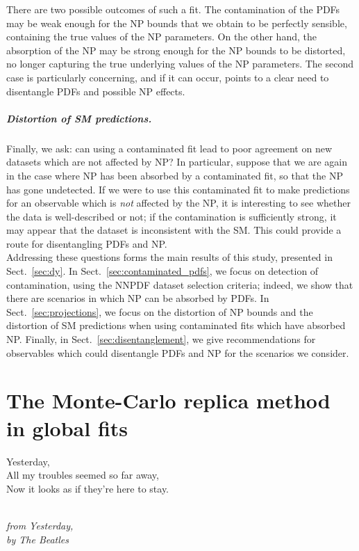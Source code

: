 \documentclass[withindex,glossary]{cam-thesis}
\begin{document}
There are two possible outcomes of such a fit. The contamination of the PDFs may be weak enough for the NP bounds that we obtain to be perfectly sensible, containing the true values of the NP parameters. On the other hand, the absorption of the NP may be strong enough for the NP bounds to be distorted, no longer capturing the true underlying values of the NP parameters. The second case is particularly concerning, and if it can occur, points to a clear need to disentangle PDFs and possible NP effects.

\paragraph{Distortion of SM predictions.} Finally, we ask: can using a contaminated fit lead to poor agreement on new datasets which are not affected by NP? In particular, suppose that we are again in the case where NP has been absorbed by a contaminated fit, so that the NP has gone undetected. If we were to use this contaminated fit to make predictions for an observable which is \textit{not} affected by the NP, it is interesting to see whether the data is well-described or not; if the contamination is sufficiently strong, it may appear that the dataset is inconsistent with the SM. This could provide a route for disentangling PDFs and NP.\\

\noindent Addressing these questions forms the main results of this study, presented in Sect.~\ref{sec:dy}. In Sect.~\ref{sec:contaminated_pdfs}, we focus on detection of contamination, using the NNPDF dataset selection criteria; indeed, we show that there are scenarios in which NP can be absorbed by PDFs. In Sect.~\ref{sec:projections}, we focus on the distortion of NP bounds and the distortion of SM predictions when using contaminated fits which have absorbed NP. Finally, in Sect.~\ref{sec:disentanglement}, we give recommendations for observables which could disentangle PDFs and NP for the scenarios we consider.




\newpage
\chapter{The Monte-Carlo replica method in global fits}
\label{chap:montecarlo}

\epigraph{Yesterday, \\ All my troubles seemed so far away, \\ Now it looks as if they're here to stay.}{\textit{\\ from Yesterday, \\ by The Beatles}}
\end{document}
